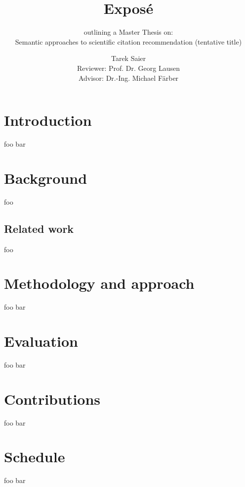 \documentclass{proseminar}
\begin{document}

\title{Expos\'e}
\subtitle{outlining a Master Thesis on:\\Semantic approaches to scientific citation recommendation (tentative title)}

\author{Tarek Saier\\Reviewer: Prof. Dr. Georg Lausen\\Advisor: Dr.-Ing. Michael Färber}

\maketitle

\section{Introduction}
foo\cite{Faerber2018} bar

\section{Background}
foo

\subsection{Related work}
foo

\section{Methodology and approach}
foo bar

\section{Evaluation}
foo bar

\section{Contributions}
foo bar

\section{Schedule}
foo bar
\end{document}
